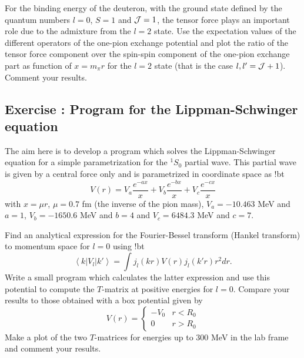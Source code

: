 \documentclass[graybox,sectrefs,envcountresetchap,open=right]{svmonodo}
\newenvironment{doconceexercise}{}{}
\newcounter{doconceexercisecounter}
\begin{document}
\begin{doconceexercise}
For the binding energy of the deuteron, with the ground state defined by the quantum numbers $l=0$, $S=1$ and ${\cal J}=1$, the tensor force plays an important role due to the admixture from the $l=2$ state. Use the expectation values of the different operators of the one-pion exchange potential and plot the ratio of the tensor force component over the spin-spin component of the one-pion exchange part as function of $x=m_\pi r$ for the $l=2$ state (that is the case $l,l'={\cal J}+1$). Comment your results.





\end{doconceexercise}


\begin{doconceexercise}

\subsection*{Exercise \thedoconceexercisecounter: Program for the Lippman-Schwinger equation}


The aim here is to develop a program which solves the Lippman-Schwinger equation for a simple parametrization for the 
$^1S_0$ partial wave. This partial wave is given by a central force only and is parametrized in coordinate space as
!bt
\[
  V(r)=V_a \frac{e^{-ax}}{x}+V_b \frac{e^{-bx}}{x}+V_c \frac{e^{-cx}}{x}
\]
with $x=\mu r$, $\mu=0.7$ fm (the inverse of the pion mass),
$V_a=-10.463$ MeV and $a=1$, $V_b=-1650.6$ MeV and $b=4$ and
$V_c=6484.3$ MeV and $c=7$. 

Find an analytical expression for 
the Fourier-Bessel transform (Hankel transform)
to momentum space for $l=0$ using
!bt
\[
\left\langle k \right | V_{l} \left | k' \right\rangle
= \int j_l(kr)V(r)j_l(k'r)r^2dr.
\]
Write a small program which calculates the latter expression
and use this potential to compute the $T$-matrix at positive energies
for $l=0$.
Compare your results to those obtained with a  box potential given by
\[
V(r)=\left\{ \begin{array}{cc} -V_0& r < R_0 \\
                                0  & r > R_0 \end{array} \right.
\]
Make a plot of the
two $T$-matrices for energies up to 300 MeV in the lab frame
and comment your results.


\end{doconceexercise}
\end{document}
